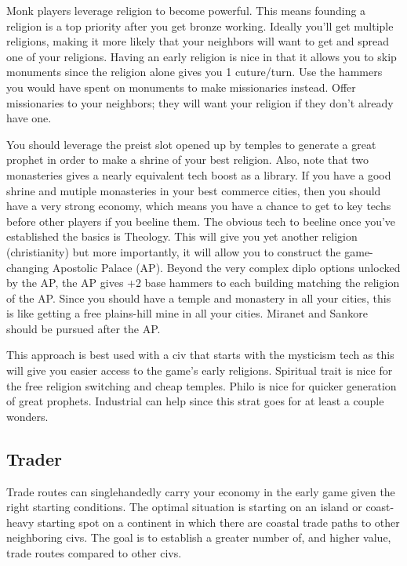 \documentclass[10pt]{article}
\begin{document}
Monk players leverage religion to become powerful. This means founding
a religion is a top priority after you get bronze working. Ideally
you'll get multiple religions, making it more likely that your
neighbors will want to get and spread one of your religions. Having an
early religion is nice in that it allows you to skip monuments since
the religion alone gives you 1 cuture/turn. Use the hammers you would
have spent on monuments to make missionaries instead. Offer
missionaries to your neighbors; they will want your religion if they
don't already have one.

You should leverage the preist slot opened up
by temples to generate a great prophet in order to make a shrine of
your best religion. Also, note that two monasteries gives a nearly
equivalent tech boost as a library. If you have a good shrine and
mutiple monasteries in your best commerce cities, then you should have
a very strong economy, which means you have a chance to get to key
techs before other players if you beeline them. The obvious tech to
beeline once you've established the basics is Theology. This will give
you yet another religion (christianity) but more importantly, it will
allow you to construct the game-changing Apostolic Palace (AP). Beyond
the very complex diplo options unlocked by the AP, the AP gives +2
base hammers to each building matching the religion of the AP. Since
you should have a temple and monastery in all your cities, this is
like getting a free plains-hill mine in all your cities.  Miranet and
Sankore should be pursued after the AP.

This approach is best used with a civ that starts with the mysticism
tech as this will give you easier access to the game's early
religions. Spiritual trait is nice for the free religion switching and
cheap temples.  Philo is nice for quicker generation of great
prophets. Industrial can help since this strat goes for at least a
couple wonders.

\subsection*{Trader}

Trade routes can singlehandedly carry your economy in the early game
given the right starting conditions.  The optimal situation is
starting on an island or coast-heavy starting spot on a continent in
which there are coastal trade paths to other neighboring civs. The
goal is to establish a greater number of, and higher value, trade
routes compared to other civs.
\end{document}
